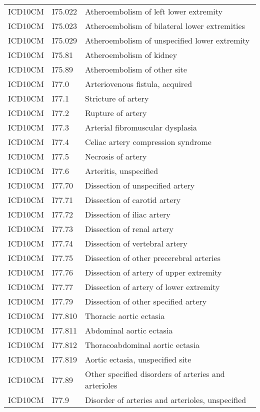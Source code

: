 \begin{longtable}{p{}p{}p{}}
  ICD10CM & I75.022 & Atheroembolism of left lower extremity \\ 
  ICD10CM & I75.023 & Atheroembolism of bilateral lower extremities \\ 
  ICD10CM & I75.029 & Atheroembolism of unspecified lower extremity \\ 
  ICD10CM & I75.81 & Atheroembolism of kidney \\ 
  ICD10CM & I75.89 & Atheroembolism of other site \\ 
  ICD10CM & I77.0 & Arteriovenous fistula, acquired \\ 
  ICD10CM & I77.1 & Stricture of artery \\ 
  ICD10CM & I77.2 & Rupture of artery \\ 
  ICD10CM & I77.3 & Arterial fibromuscular dysplasia \\ 
  ICD10CM & I77.4 & Celiac artery compression syndrome \\ 
  ICD10CM & I77.5 & Necrosis of artery \\ 
  ICD10CM & I77.6 & Arteritis, unspecified \\ 
  ICD10CM & I77.70 & Dissection of unspecified artery \\ 
  ICD10CM & I77.71 & Dissection of carotid artery \\ 
  ICD10CM & I77.72 & Dissection of iliac artery \\ 
  ICD10CM & I77.73 & Dissection of renal artery \\ 
  ICD10CM & I77.74 & Dissection of vertebral artery \\ 
  ICD10CM & I77.75 & Dissection of other precerebral arteries \\ 
  ICD10CM & I77.76 & Dissection of artery of upper extremity \\ 
  ICD10CM & I77.77 & Dissection of artery of lower extremity \\ 
  ICD10CM & I77.79 & Dissection of other specified artery \\ 
  ICD10CM & I77.810 & Thoracic aortic ectasia \\ 
  ICD10CM & I77.811 & Abdominal aortic ectasia \\ 
  ICD10CM & I77.812 & Thoracoabdominal aortic ectasia \\ 
  ICD10CM & I77.819 & Aortic ectasia, unspecified site \\ 
  ICD10CM & I77.89 & Other specified disorders of arteries and arterioles \\ 
  ICD10CM & I77.9 & Disorder of arteries and arterioles, unspecified \\ 

\end{longtable}
